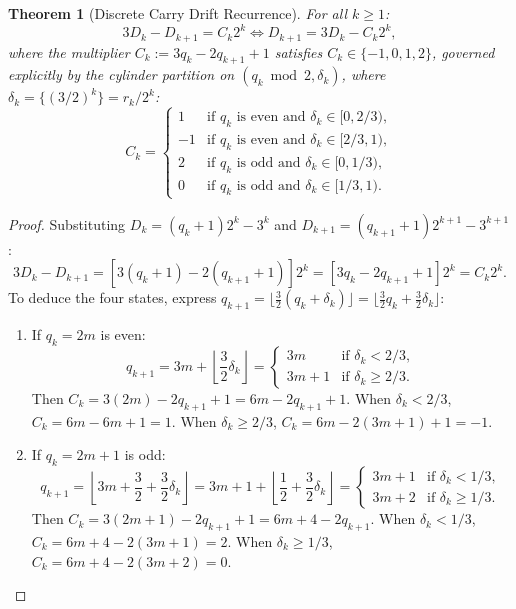 \documentclass[11pt,reqno]{amsart}
\newtheorem{theorem}{Theorem}[section]
\theoremstyle{definition}
\numberwithin{equation}{section}
\begin{document}
\begin{theorem}[Discrete Carry Drift Recurrence]\label{thm:carry_drift}
For all $k \ge 1$:
\begin{equation}\label{eq:drift_equation}
3 D_k - D_{k+1} = C_k 2^k \iff D_{k+1} = 3 D_k - C_k 2^k,
\end{equation}
where the multiplier $C_k := 3 q_k - 2 q_{k+1} + 1$ satisfies $C_k \in \{-1, 0, 1, 2\}$, governed explicitly by the cylinder partition on $(q_k \bmod 2, \delta_k)$, where $\delta_k = \{(3/2)^k\} = r_k / 2^k$:
\begin{equation}\label{eq:state_partition}
C_k = \begin{cases}
1 & \text{if } q_k \text{ is even and } \delta_k \in [0, 2/3), \\
-1 & \text{if } q_k \text{ is even and } \delta_k \in [2/3, 1), \\
2 & \text{if } q_k \text{ is odd and } \delta_k \in [0, 1/3), \\
0 & \text{if } q_k \text{ is odd and } \delta_k \in [1/3, 1).
\end{cases}
\end{equation}
\end{theorem}

\begin{proof}
Substituting $D_k = (q_k + 1)2^k - 3^k$ and $D_{k+1} = (q_{k+1} + 1)2^{k+1} - 3^{k+1}$:
\[
3 D_k - D_{k+1} = [3(q_k + 1) - 2(q_{k+1} + 1)] 2^k = [3 q_k - 2 q_{k+1} + 1] 2^k = C_k 2^k.
\]
To deduce the four states, express $q_{k+1} = \lfloor \frac{3}{2} (q_k + \delta_k) \rfloor = \lfloor \frac{3}{2} q_k + \frac{3}{2} \delta_k \rfloor$:
\begin{enumerate}
    \item If $q_k = 2m$ is even:
    \[
    q_{k+1} = 3m + \left\lfloor \frac{3}{2} \delta_k \right\rfloor = \begin{cases}
    3m & \text{if } \delta_k < 2/3, \\
    3m + 1 & \text{if } \delta_k \ge 2/3.
    \end{cases}
    \]
    Then $C_k = 3(2m) - 2 q_{k+1} + 1 = 6m - 2 q_{k+1} + 1$.
    When $\delta_k < 2/3$, $C_k = 6m - 6m + 1 = 1$.
    When $\delta_k \ge 2/3$, $C_k = 6m - 2(3m + 1) + 1 = -1$.
    \item If $q_k = 2m + 1$ is odd:
    \[
    q_{k+1} = \left\lfloor 3m + \frac{3}{2} + \frac{3}{2} \delta_k \right\rfloor = 3m + 1 + \left\lfloor \frac{1}{2} + \frac{3}{2} \delta_k \right\rfloor = \begin{cases}
    3m + 1 & \text{if } \delta_k < 1/3, \\
    3m + 2 & \text{if } \delta_k \ge 1/3.
    \end{cases}
    \]
    Then $C_k = 3(2m + 1) - 2 q_{k+1} + 1 = 6m + 4 - 2 q_{k+1}$.
    When $\delta_k < 1/3$, $C_k = 6m + 4 - 2(3m + 1) = 2$.
    When $\delta_k \ge 1/3$, $C_k = 6m + 4 - 2(3m + 2) = 0$. \qedhere
\end{enumerate}
\end{proof}
\end{document}
